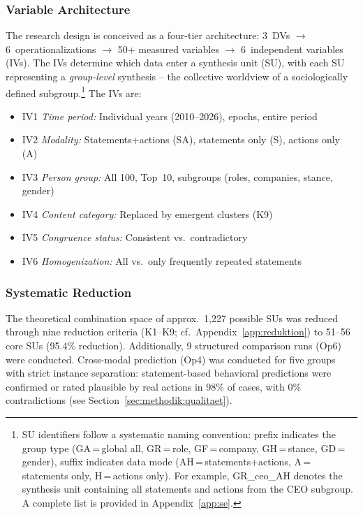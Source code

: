 \documentclass[12pt,a4paper]{article}
\begin{document}
\subsubsection{Variable Architecture}

The research design is conceived as a four-tier architecture: 3~DVs $\to$ 6~operationalizations $\to$ 50+ measured variables $\to$ 6~independent variables (IVs). The IVs determine which data enter a synthesis unit (SU), with each SU representing a \emph{group-level} synthesis -- the collective worldview of a sociologically defined subgroup.\footnote{SU identifiers follow a systematic naming convention: prefix indicates the group type (GA\,=\,global all, GR\,=\,role, GF\,=\,company, GH\,=\,stance, GD\,=\,gender), suffix indicates data mode (AH\,=\,statements+actions, A\,=\,statements only, H\,=\,actions only). For example, GR\_ceo\_AH denotes the synthesis unit containing all statements and actions from the CEO subgroup. A complete list is provided in Appendix~\ref{app:se}.} The IVs are:

\begin{itemize}[nosep]
  \item IV1 \emph{Time period:} Individual years (2010--2026), epochs, entire period
  \item IV2 \emph{Modality:} Statements+actions (SA), statements only (S), actions only (A)
  \item IV3 \emph{Person group:} All 100, Top~10, subgroups (roles, companies, stance, gender)
  \item IV4 \emph{Content category:} Replaced by emergent clusters (K9)
  \item IV5 \emph{Congruence status:} Consistent vs.\ contradictory
  \item IV6 \emph{Homogenization:} All vs.\ only frequently repeated statements
\end{itemize}

\subsubsection{Systematic Reduction}

The theoretical combination space of approx.\ 1,227 possible SUs was reduced through nine reduction criteria (K1--K9; cf.\ Appendix~\ref{app:reduktion}) to 51--56 core SUs (95.4\% reduction). Additionally, 9 structured comparison runs (Op6) were conducted. Cross-modal prediction (Op4) was conducted for five groups with strict instance separation: statement-based behavioral predictions were confirmed or rated plausible by real actions in 98\% of cases, with 0\% contradictions (see Section~\ref{sec:methodik:qualitaet}).
\end{document}

